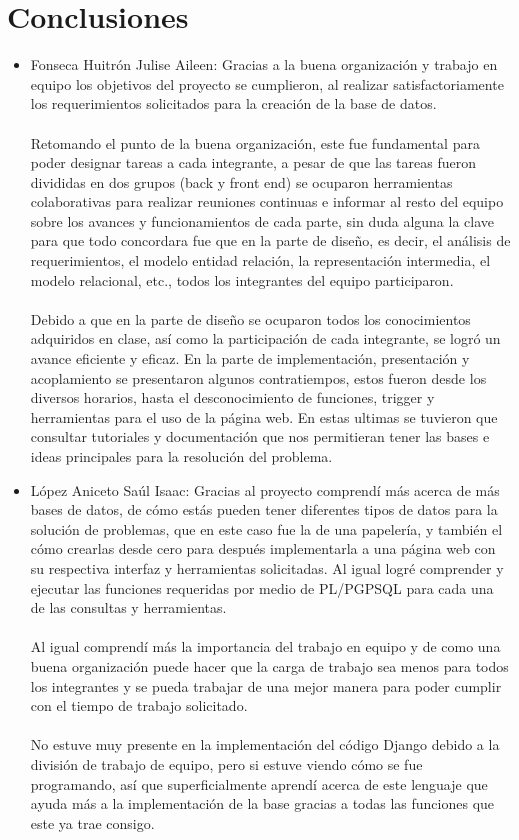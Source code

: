 \documentclass[12pt,letterpaper]{article}
\begin{document}
	\newpage 
	\section{Conclusiones}
	\begin{itemize}
		\item Fonseca Huitrón Julise Aileen:
		\subitem Gracias a la buena organización y trabajo en equipo los objetivos del proyecto se cumplieron, al realizar satisfactoriamente los requerimientos solicitados para la creación de la base de datos.\\
		\\Retomando el punto de la buena organización, este fue fundamental para poder designar tareas a  cada integrante, a pesar de que las tareas fueron divididas en dos grupos (back y front end) se ocuparon herramientas colaborativas para realizar reuniones continuas e informar al resto del equipo sobre los avances y funcionamientos de cada parte, sin duda alguna la clave para que todo concordara fue que en la parte de diseño, es decir, el análisis de requerimientos, el modelo entidad relación, la representación intermedia, el modelo relacional, etc., todos los integrantes del equipo participaron. \\
		\\Debido a que en la parte de diseño se ocuparon todos los conocimientos adquiridos en clase, así como la participación de cada integrante, se logró un avance eficiente y eficaz. En la parte de implementación, presentación y acoplamiento se presentaron algunos contratiempos, estos fueron desde los diversos horarios, hasta el desconocimiento de funciones, trigger y herramientas para el uso de la página web. En estas ultimas se tuvieron que consultar tutoriales y documentación que nos permitieran tener las bases e ideas principales para la resolución del problema. \\
		
		
		\item López Aniceto Saúl Isaac:
		\subitem Gracias al proyecto comprendí más acerca de más bases de datos, de cómo estás pueden tener diferentes tipos de datos para la solución de problemas, que en este caso fue la de una papelería, y también el cómo crearlas desde cero para después implementarla a una página web con su respectiva interfaz y herramientas solicitadas. Al igual logré comprender y ejecutar las funciones requeridas por medio de PL/PGPSQL para cada una de las consultas y herramientas. \\
		\\Al igual comprendí más la importancia del trabajo en equipo y de como una buena organización puede hacer que la carga de trabajo sea menos para todos los integrantes y se pueda trabajar de una mejor manera para poder cumplir con el tiempo de trabajo solicitado. \\
		\\No estuve muy presente en la implementación del código Django debido a la división de trabajo de equipo, pero si estuve viendo cómo se fue programando, así que superficialmente aprendí acerca de este lenguaje que ayuda más a la implementación de la base gracias a todas las funciones que este ya trae consigo. \\
		

\end{itemize}
\end{document}
